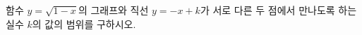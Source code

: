 \hspace*{2mm}\begin{minipage}[t]{\dimexpr\linewidth-2mm\relax}\vspace{0pt}
함수 $y=\sqrt{1-x}$의 그래프와 직선 $y=-x+k$가 서로 다른 두 점에서 만나도록 하는 실수 $k$의 값의 범위를 구하시오.\end{minipage}
